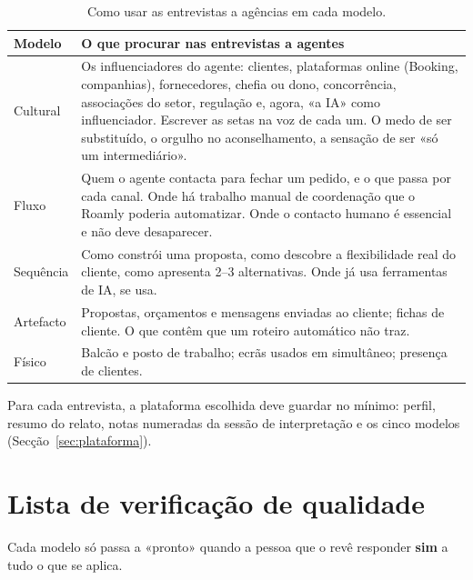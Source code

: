 \documentclass[11pt,a4paper]{article}
\begin{document}
\begin{table}[h]
\centering\small
\begin{tabularx}{\textwidth}{@{}p{2.2cm}L@{}}
\toprule
\textbf{Modelo} & \textbf{O que procurar nas entrevistas a agentes} \\
\midrule
Cultural & Os influenciadores do agente: clientes, plataformas online (Booking, companhias), fornecedores, chefia ou dono, concorrência, associações do setor, regulação e, agora, «a IA» como influenciador. Escrever as setas na voz de cada um. O medo de ser substituído, o orgulho no aconselhamento, a sensação de ser «só um intermediário». \\
Fluxo & Quem o agente contacta para fechar um pedido, e o que passa por cada canal. Onde há trabalho manual de coordenação que o Roamly poderia automatizar. Onde o contacto humano é essencial e não deve desaparecer. \\
Sequência & Como constrói uma proposta, como descobre a flexibilidade real do cliente, como apresenta 2--3 alternativas. Onde já usa ferramentas de IA, se usa. \\
Artefacto & Propostas, orçamentos e mensagens enviadas ao cliente; fichas de cliente. O que contêm que um roteiro automático não traz. \\
Físico & Balcão e posto de trabalho; ecrãs usados em simultâneo; presença de clientes. \\
\bottomrule
\end{tabularx}
\caption{Como usar as entrevistas a agências em cada modelo.}
\end{table}

Para cada entrevista, a plataforma escolhida deve guardar no mínimo: perfil, resumo do relato, notas numeradas da sessão de interpretação e os cinco modelos (Secção~\ref{sec:plataforma}).

\section{Lista de verificação de qualidade}
\label{sec:qualidade}

Cada modelo só passa a «pronto» quando a pessoa que o revê responder \textbf{sim} a tudo o que se aplica.
\end{document}

